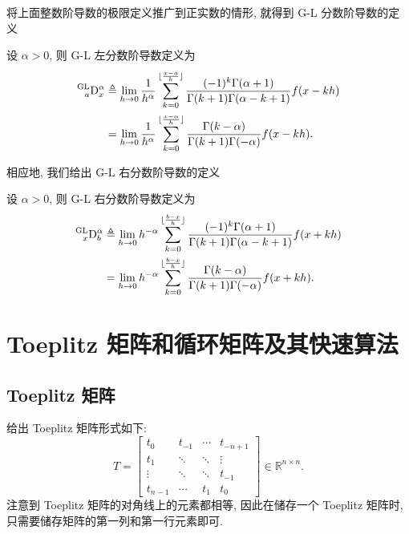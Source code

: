 \documentclass{ecnumaster}
\begin{document}
将上面整数阶导数的极限定义推广到正实数的情形,
就得到 G-L 分数阶导数的定义
\begin{definition}
  设 $\alpha > 0$, 则 G-L 左分数阶导数定义为
    \begin{align*}
      \prescript{{\mathrm{GL}}}{a}{\mathrm{D}}_x^{\alpha}
      & \triangleq \lim _{h \to 0} \frac{1}{h^{\alpha}} \sum _{k=0}^{\lfloor \frac{x-a}{h} \rfloor}
        \frac{(-1)^k \Gamma(\alpha + 1)}{\Gamma (k+1) \Gamma (\alpha - k + 1)}f(x - kh)\\
      &= \lim _{h \to 0} \frac{1}{h^{\alpha}} \sum _{k=0}^{\lfloor \frac{x-\alpha}{h} \rfloor}
        \frac{\Gamma (k - \alpha)}{\Gamma (k+1) \Gamma (-\alpha)}f(x-kh).
    \end{align*}
\end{definition}
%
相应地, 我们给出 G-L 右分数阶导数的定义
\begin{definition}
  设 $\alpha > 0$, 则 G-L 右分数阶导数定义为
  \begin{align*}
      \prescript{{\mathrm{GL}}}{x}{{\mathrm{D}}}_b^{\alpha}
      & \triangleq \lim _{h \to 0} h^{-\alpha} \sum _{k=0}^{\lfloor \frac{b-x}{h} \rfloor}
        \frac{(-1)^k \Gamma (\alpha + 1)}{\Gamma (k+1) \Gamma (\alpha - k + 1)} f(x+kh)\\
      &= \lim _{h \to 0} h^{-\alpha} \sum _{k=0}^{\lfloor \frac{b-x}{h} \rfloor}
        \frac{\Gamma (k-\alpha)}{\Gamma (k+1) \Gamma (-\alpha)} f(x+kh).
    \end{align*}
\end{definition}

\section{Toeplitz 矩阵和循环矩阵及其快速算法}

\subsection{Toeplitz 矩阵}
给出 Toeplitz 矩阵形式如下:
$$
  T = \left[\begin{matrix} t_0 & t_{-1} & \cdots & t_{-n+1}\\
  t_1 & \ddots & \ddots & \vdots \\
  \vdots & \ddots & \ddots & t_{-1} \\
  t_{n-1} & \cdots & t_1 & t_0  \end{matrix} \right] \in \mathbb{R}^{n \times n}.
$$
注意到 Toeplitz 矩阵的对角线上的元素都相等,
因此在储存一个 Toeplitz 矩阵时, 只需要储存矩阵的第一列和第一行元素即可.
\end{document}
